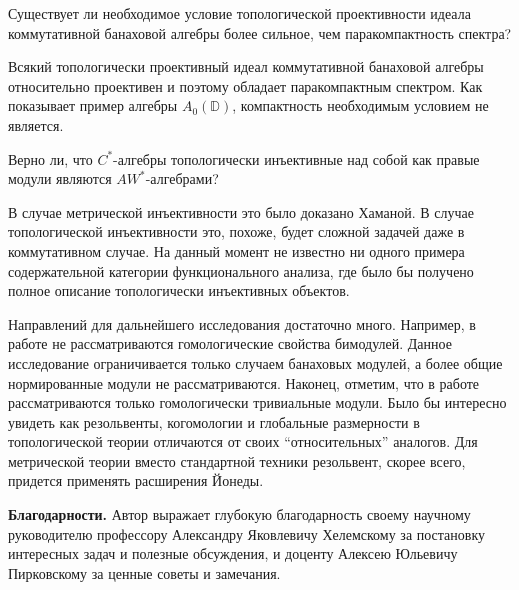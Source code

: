 \begin{problem*} Существует ли необходимое условие топологической проективности
    идеала коммутативной банаховой алгебры более сильное, чем паракомпактность
    спектра?
\end{problem*}

Всякий топологически проективный идеал коммутативной банаховой алгебры
относительно проективен и поэтому обладает паракомпактным спектром. Как
показывает пример алгебры $A_0(\mathbb{D})$, компактность необходимым условием
не является.

\begin{problem*} Верно ли, что $C^*$-алгебры топологически инъективные над собой
    как правые модули являются $AW^*$-алгебрами?
\end{problem*}

В случае метрической инъективности это было доказано Хаманой. В случае
топологической инъективности это, похоже, будет сложной задачей даже в
коммутативном случае. На данный момент не известно ни одного примера
содержательной категории функционального анализа, где было бы получено полное
описание топологически инъективных объектов.

Направлений для дальнейшего исследования достаточно много. Например, в работе не
рассматриваются гомологические свойства бимодулей. Данное исследование
ограничивается только случаем банаховых модулей, а более общие нормированные
модули не рассматриваются. Наконец, отметим, что в работе рассматриваются только
гомологически тривиальные модули. Было бы интересно увидеть как резольвенты,
когомологии и глобальные размерности в топологической теории отличаются от своих
``относительных'' аналогов. Для метрической теории вместо стандартной техники
резольвент, скорее всего, придется применять расширения Йонеды.

\textbf{Благодарности.} Автор выражает глубокую благодарность своему научному
руководителю профессору Александру Яковлевичу Хелемскому за постановку
интересных задач и полезные обсуждения, и доценту Алексею Юльевичу Пирковскому
за ценные советы и замечания.

\renewcommand{\refname}{\Large Публикации автора по теме диссертации}
\printbibliography[keyword=phdresult]